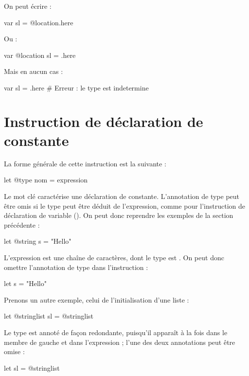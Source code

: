 On peut écrire :
\begin{galgascode}
var sl = @location.here
\end{galgascode}

Ou :
\begin{galgascode}
var @location sl = .here
\end{galgascode}

Mais en aucun cas :
\begin{galgascode}
var sl = .here # Erreur : le type est indetermine
\end{galgascode}





\section{Instruction de déclaration de constante}

La forme générale de cette instruction est la suivante :
\begin{galgascode}
let @type nom = expression
\end{galgascode}

Le mot clé  caractérise une déclaration de constante. L'annotation de type peut être omis si le type peut être déduit de l'expression, comme pour l'instruction de déclaration de variable (). On peut donc reprendre les exemples de la section précédente :
\begin{galgascode}
let @string s = "Hello"
\end{galgascode}

L'expression est une chaîne de caractères, dont le type est . On peut donc omettre l'annotation de type dans l'instruction :
\begin{galgascode}
let s = "Hello"
\end{galgascode}


Prenons un autre exemple, celui de l'initialisation d'une liste :
\begin{galgascode}
let @stringlist sl = @stringlist {}
\end{galgascode}

Le type est annoté de façon redondante, puisqu'il apparaît à la fois dans le membre de gauche et dans l'expression ; l'une des deux annotations peut être omise :
\begin{galgascode}
let sl = @stringlist {}
\end{galgascode}

